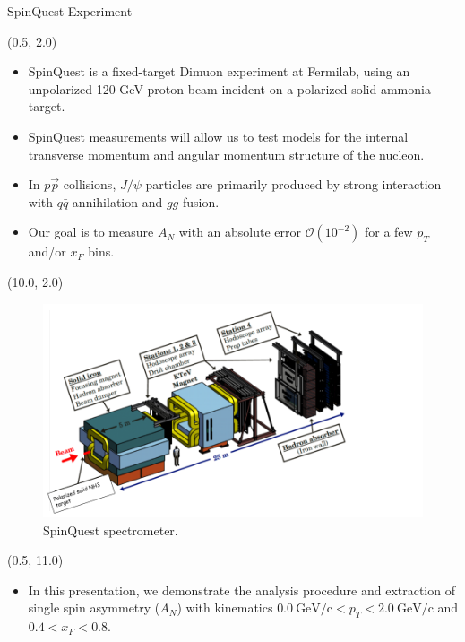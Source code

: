 \documentclass[10pt, xcolor={dvipsnames}, aspectratio = 169]{beamer}
\newcommand{\citeme}[1]{{\tiny \footfullcite{#1}}}
\newcommand{\jpsi}{$J/\psi$ }
\newcommand{\pp}{$p\vec{p}$ }
\begin{document}
\begin{frame}{SpinQuest Experiment}

\begin{textblock}{9.0}(0.5, 2.0)

\begin{itemize}

\item SpinQuest is a fixed-target Dimuon experiment at Fermilab, using an unpolarized 120 GeV proton beam incident on a
polarized solid ammonia target.

\item SpinQuest measurements will allow us to test models for the internal transverse momentum and angular momentum
structure of the nucleon.

\item In \pp collisions, \jpsi particles are primarily produced by strong interaction with $q\bar{q}$ annihilation and $gg$ fusion.

\item Our goal is to measure $A_{N}$ with an absolute error $\mathcal{O}(10^{-2})$ for a few $p_{T}$ and/or $x_{F}$ bins.

\end{itemize}

\end{textblock}


\begin{textblock}{7.0}(10.0, 2.0)

\begin{figure}
    \centering
    \includegraphics[width = 7.0 cm]{imgs/spectrometer.png}
    \caption{SpinQuest spectrometer. \citeme{SeaQuest:2019hsx}}
\end{figure}
\end{textblock}

\begin{textblock}{14.0}(0.5, 11.0)
\begin{itemize}
    \item In this presentation, we demonstrate the analysis procedure and  extraction of single spin asymmetry ($A_{N}$) with kinematics $0.0 \: \text{GeV/c}< p_{T} < 2.0 \: \text{GeV/c}$ and $0.4 < x_{F} < 0.8$.
\end{itemize}
\end{textblock}

\end{frame}
\end{document}
